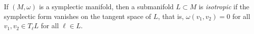 \documentclass[12pt]{article}
\begin{document}
If $(M,\omega)$ is a symplectic manifold, then a submanifold $L\subset M$ is {\em isotropic} if the 
symplectic form vanishes on the tangent space of $L$, that is, $\omega(v_1,v_2)=0$ for all
$v_1,v_2\in T_\ell L$ for all $\ell\in L$.
\end{document}
